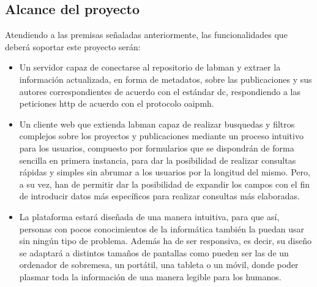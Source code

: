 \subsection{Alcance del proyecto}

Atendiendo a las premisas señaladas anteriormente, las funcionalidades que deberá soportar este proyecto serán:

\begin{itemize}
	\item Un servidor capaz de conectarse al repositorio de \acrshort{labman} y extraer la información actualizada, en forma de metadatos, sobre las publicaciones y sus autores correspondientes de acuerdo con el estándar \acrlong{dc}\cite{DC}, respondiendo a las peticiones \acrshort{http} de acuerdo con el protocolo \acrshort{oaipmh}.
	
	\item Un cliente web que extienda \acrshort{labman} capaz de realizar busquedas y filtros complejos sobre los proyectos y publicaciones mediante un proceso intuitivo para los usuarios, compuesto por formularios que se dispondrán de forma sencilla en primera instancia, para dar la posibilidad de realizar consultas rápidas y simples sin abrumar a los usuarios por la longitud del mismo. Pero, a su vez, han de permitir dar la posibilidad de expandir los campos con el fin de introducir datos más específicos para realizar consultas más elaboradas.

	\item La plataforma estará diseñada de una manera intuitiva, para que así, personas con pocos conocimientos de la informática también la puedan usar sin ningún tipo de problema. Además ha de ser responsiva, es decir, su diseño se adaptará a distintos tamaños de pantallas como pueden ser las de un ordenador de sobremesa, un portátil, una tableta o un móvil, donde poder plasmar toda la información de una manera legible para los humanos.
\end{itemize}